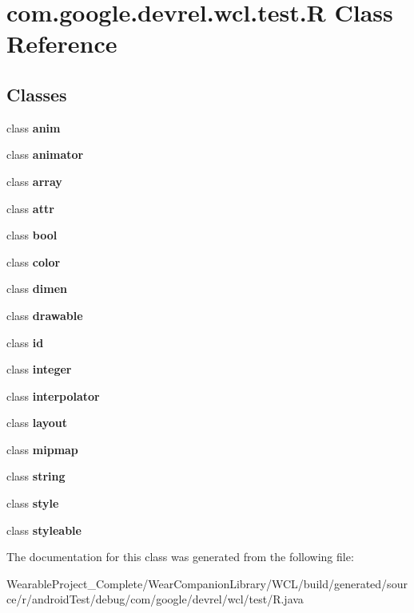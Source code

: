 \hypertarget{classcom_1_1google_1_1devrel_1_1wcl_1_1test_1_1R}{}\section{com.\+google.\+devrel.\+wcl.\+test.\+R Class Reference}
\label{classcom_1_1google_1_1devrel_1_1wcl_1_1test_1_1R}
\subsection*{Classes}
\begin{DoxyCompactItemize}
\item 
class {\bfseries anim}
\item 
class {\bfseries animator}
\item 
class {\bfseries array}
\item 
class {\bfseries attr}
\item 
class {\bfseries bool}
\item 
class {\bfseries color}
\item 
class {\bfseries dimen}
\item 
class {\bfseries drawable}
\item 
class {\bfseries id}
\item 
class {\bfseries integer}
\item 
class {\bfseries interpolator}
\item 
class {\bfseries layout}
\item 
class {\bfseries mipmap}
\item 
class {\bfseries string}
\item 
class {\bfseries style}
\item 
class {\bfseries styleable}
\end{DoxyCompactItemize}


The documentation for this class was generated from the following file\+:\begin{DoxyCompactItemize}
\item 
Wearable\+Project\+\_\+\+Complete/\+Wear\+Companion\+Library/\+W\+C\+L/build/generated/source/r/android\+Test/debug/com/google/devrel/wcl/test/R.\+java\end{DoxyCompactItemize}
